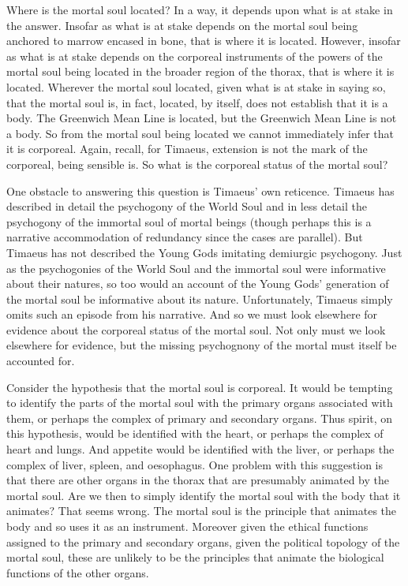 Where is the mortal soul located? In a way, it depends upon what is at stake in the answer. Insofar as what is at stake depends on the mortal soul being anchored to marrow encased in bone, that is where it is located. However, insofar as what is at stake depends on the corporeal instruments of the powers of the mortal soul being located in the broader region of the thorax, that is where it is located. Wherever the mortal soul located, given what is at stake in saying so, that the mortal soul is, in fact, located, by itself, does not establish that it is a body. The Greenwich Mean Line is located, but the Greenwich Mean Line is not a body. So from the mortal soul being located we cannot immediately infer that it is corporeal. Again, recall, for Timaeus, extension is not the mark of the corporeal, being sensible is. So what is the corporeal status of the mortal soul?

One obstacle to answering this question is Timaeus' own reticence. Timaeus has described in detail the psychogony of the World Soul and in less detail the psychogony of the immortal soul of mortal beings (though perhaps this is a narrative accommodation of redundancy since the cases are parallel). But Timaeus has not described the Young Gods imitating demiurgic psychogony. Just as the psychogonies of the World Soul and the immortal soul were informative about their natures, so too would an account of the Young Gods' generation of the mortal soul be informative about its nature. Unfortunately, Timaeus simply omits such an episode from his narrative. And so we must look elsewhere for evidence about the corporeal status of the mortal soul. Not only must we look elsewhere for evidence, but the missing psychognony of the mortal must itself be accounted for.

Consider the hypothesis that the mortal soul is corporeal. It would be tempting to identify the parts of the mortal soul with the primary organs associated with them, or perhaps the complex of primary and secondary organs. Thus spirit, on this hypothesis, would be identified with the heart, or perhaps the complex of heart and lungs. And appetite would be identified with the liver, or perhaps the complex of liver, spleen, and oesophagus. One problem with this suggestion is that there are other organs in the thorax that are presumably animated by the mortal soul. Are we then to simply identify the mortal soul with the body that it animates? That seems wrong. The mortal soul is the principle that animates the body and so uses it as an instrument. Moreover given the ethical functions assigned to the primary and secondary organs, given the political topology of the mortal soul, these are unlikely to be the principles that animate the biological functions of the other organs.

